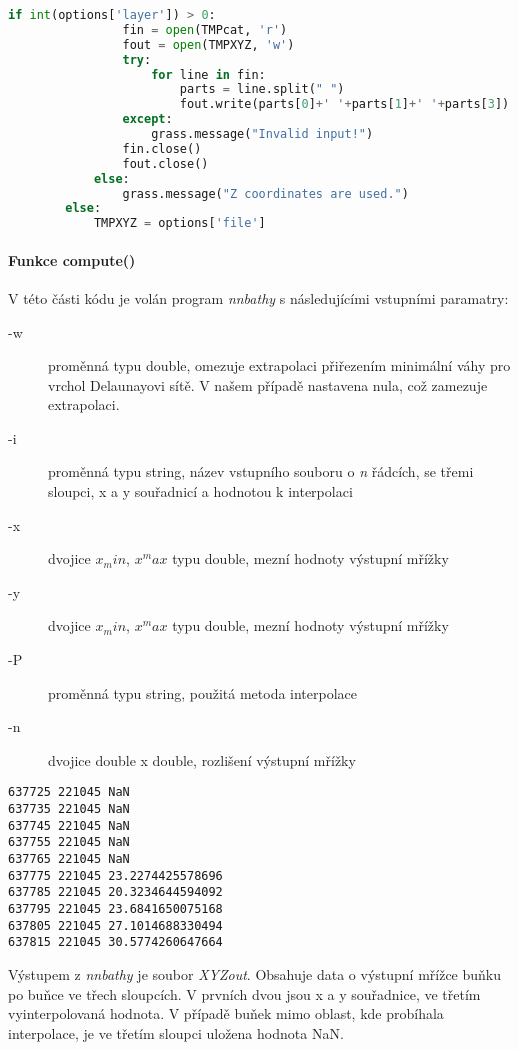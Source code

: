 \documentclass[12pt,a4paper]{article}
\begin{document}
\begin{lstlisting}[language=python, caption={python version}]
            if int(options['layer']) > 0:
                fin = open(TMPcat, 'r')
                fout = open(TMPXYZ, 'w')
                try:
                    for line in fin:
                        parts = line.split(" ")
                        fout.write(parts[0]+' '+parts[1]+' '+parts[3])
                except:
                    grass.message("Invalid input!")
                fin.close()
                fout.close()
            else:
                grass.message("Z coordinates are used.")
        else:
            TMPXYZ = options['file']
\end{lstlisting}

\paragraph{Funkce compute()}
V této části kódu je volán program \textit{nnbathy} s následujícími vstupními paramatry:
\begin{description}
\item[-w]{proměnná typu double, omezuje extrapolaci přiřezením minimální váhy pro vrchol Delaunayovi sítě. V našem případě nastavena nula, což zamezuje extrapolaci.}
\item[-i]{proměnná typu string, název vstupního souboru o \textit{n} řádcích, se třemi sloupci, x a y souřadnicí a hodnotou k interpolaci}
\item[-x]{dvojice $x_min$, $x^max$ typu double, mezní hodnoty výstupní mřížky}
\item[-y]{dvojice $x_min$, $x^max$ typu double, mezní hodnoty výstupní mřížky}
\item[-P]{proměnná typu string, použitá metoda interpolace}
\item[-n]{dvojice double x double, rozlišení výstupní mřížky}
\end{description}

\begin{lstlisting}
637725 221045 NaN
637735 221045 NaN
637745 221045 NaN
637755 221045 NaN
637765 221045 NaN
637775 221045 23.2274425578696
637785 221045 20.3234644594092
637795 221045 23.6841650075168
637805 221045 27.1014688330494
637815 221045 30.5774260647664
\end{lstlisting}

Výstupem z \textit{nnbathy} je soubor \textit{XYZout}. Obsahuje data o výstupní mřížce buňku po buňce ve třech sloupcích. V prvních dvou jsou x a y souřadnice, ve třetím vyinterpolovaná hodnota. V případě buňek mimo oblast, kde probíhala interpolace, je ve třetím sloupci uložena hodnota NaN.
\end{document}
